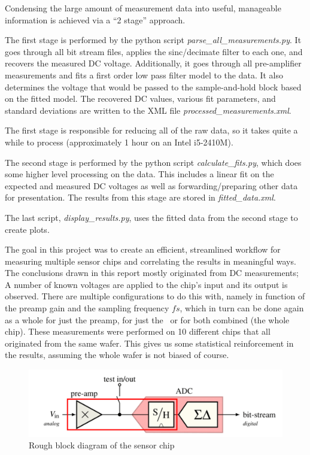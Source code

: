 Condensing  the  large amount of  measurement  data  into  useful,  manageable
information  is  achieved  via  a  ``2 stage''  approach.

The    first    stage     is     performed     by     the     python    script
\textit{parse\_all\_measurements.py}. It goes through  all  bit  stream files,
applies  the  sinc/decimate filter to each one, and recovers the  measured  DC
voltage. Additionally, it goes through all pre-amplifier measurements and fits
a  first order low pass filter model to  the  data.  It  also  determines  the
voltage that would be passed to the sample-and-hold  block based on the fitted
model.  The  recovered   DC  values,  various  fit  parameters,  and  standard
deviations  are written to the XML file  \textit{processed\_measurements.xml}.

The first stage  is  responsible for reducing all of the raw data, so it takes
quite  a  while to process  (approximately  1  hour  on  an  Intel  i5-2410M).

The     second     stage     is    performed    by    the    python     script
\textit{calculate\_fits.py}, which does  some  higher  level processing on the
data. This includes a linear fit on the expected and measured DC  voltages  as
well as  forwarding/preparing  other  data  for presentation. The results from
this stage are stored in \textit{fitted\_data.xml}.

The  last script, \textit{display\_results.py}, uses the fitted data from  the
second stage to create plots.

The goal in this project was  to create an efficient, streamlined workflow for
measuring  multiple sensor  chips and  correlating the  results in  meaningful
ways.   The  conclusions  drawn  in  this report  mostly  originated  from  DC
measurements; A number  of known voltages are applied to  the chip's input and
its output  is observed. There  are multiple configurations  to do  this with,
namely in function  of the preamp gain and the  sampling frequency $fs$, which
in turn can be done again as a whole for just the preamp, for just the \sdm~or
for both  combined (the whole  chip). These measurements were performed  on 10
different chips that  all originated from the same wafer.   This gives us some
statistical  reinforcement in  the results,  assuming the  whole wafer  is not
biased of course.

\begin{figure}[t]
    \centering
    \includegraphics[width=.8\linewidth]{images/blockdiagram.png}
    \caption{Rough block diagram of the sensor chip}
    \label{fig:blockdiagram}
\end{figure}

